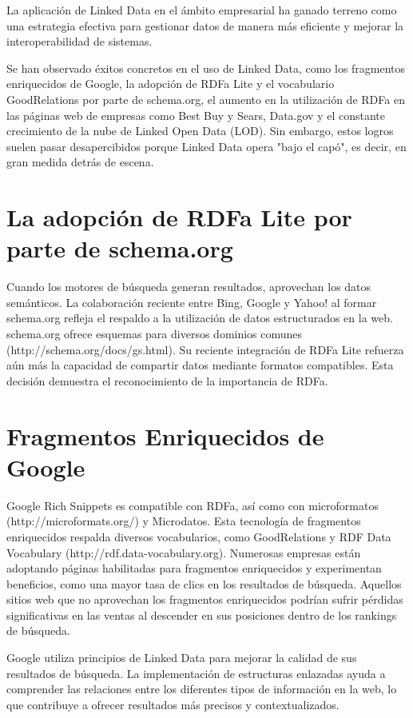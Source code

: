 \documentclass[11pt]{report}
\begin{document}
La aplicación de Linked Data en el ámbito empresarial ha ganado terreno como una estrategia efectiva para gestionar datos de manera más eficiente y mejorar la interoperabilidad de sistemas.

Se han observado éxitos concretos en el uso de Linked Data, como los fragmentos enriquecidos de Google, la adopción de RDFa Lite y el vocabulario GoodRelations por parte de schema.org, el aumento en la utilización de RDFa en las páginas web de empresas como Best Buy y Sears, Data.gov y el constante crecimiento de la nube de Linked Open Data (LOD). Sin embargo, estos logros suelen pasar desapercibidos porque Linked Data opera "bajo el capó", es decir, en gran medida detrás de escena.

\section{La adopción de RDFa Lite por parte de schema.org}

		Cuando los motores de búsqueda generan resultados, aprovechan los datos semánticos. La colaboración reciente entre Bing, Google y Yahoo! al formar schema.org refleja el respaldo a la utilización de datos estructurados en la web. schema.org ofrece esquemas para diversos dominios comunes (http://schema.org/docs/gs.html). Su reciente integración de RDFa Lite refuerza aún más la capacidad de compartir datos mediante formatos compatibles. Esta decisión demuestra el reconocimiento de la importancia de RDFa.
\section{Fragmentos Enriquecidos de Google}

		Google Rich Snippets es compatible con RDFa, así como con microformatos (http://microformats.org/) y Microdatos. Esta tecnología de fragmentos enriquecidos respalda diversos vocabularios, como GoodRelations y RDF Data Vocabulary (http://rdf.data-vocabulary.org). Numerosas empresas están adoptando páginas habilitadas para fragmentos enriquecidos y experimentan beneficios, como una mayor tasa de clics en los resultados de búsqueda. Aquellos sitios web que no aprovechan los fragmentos enriquecidos podrían sufrir pérdidas significativas en las ventas al descender en sus posiciones dentro de los rankings de búsqueda.

        Google utiliza principios de Linked Data para mejorar la calidad de sus resultados de búsqueda. La implementación de estructuras enlazadas ayuda a comprender las relaciones entre los diferentes tipos de información en la web, lo que contribuye a ofrecer resultados más precisos y contextualizados.
\end{document}
